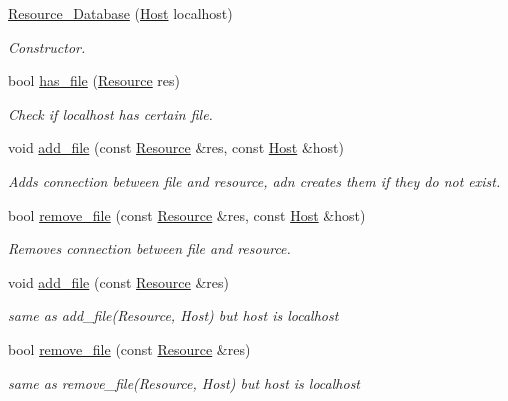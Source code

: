 \begin{DoxyCompactItemize}
\item 
\hyperlink{classsimpleP2P_1_1Resource__Database_a0158b1b1c4583d60534c2bea5dc437a3}{Resource\+\_\+\+Database} (\hyperlink{classsimpleP2P_1_1Host}{Host} localhost)
\begin{DoxyCompactList}\small\item\em Constructor. \end{DoxyCompactList}\item 
bool \hyperlink{classsimpleP2P_1_1Resource__Database_abcb6489372a4030199425ce45aaa5a6b}{has\+\_\+file} (\hyperlink{classsimpleP2P_1_1Resource}{Resource} res)
\begin{DoxyCompactList}\small\item\em Check if localhost has certain file. \end{DoxyCompactList}\item 
void \hyperlink{classsimpleP2P_1_1Resource__Database_a7afdd297b15fb225b61f9d52e2ab9cc6}{add\+\_\+file} (const \hyperlink{classsimpleP2P_1_1Resource}{Resource} \&res, const \hyperlink{classsimpleP2P_1_1Host}{Host} \&host)
\begin{DoxyCompactList}\small\item\em Adds connection between file and resource, adn creates them if they do not exist. \end{DoxyCompactList}\item 
bool \hyperlink{classsimpleP2P_1_1Resource__Database_a9b0fe1012eba333db6d8e99b02764d4d}{remove\+\_\+file} (const \hyperlink{classsimpleP2P_1_1Resource}{Resource} \&res, const \hyperlink{classsimpleP2P_1_1Host}{Host} \&host)
\begin{DoxyCompactList}\small\item\em Removes connection between file and resource. \end{DoxyCompactList}\item 
void \hyperlink{classsimpleP2P_1_1Resource__Database_a8ac7f42f7de6f3281974d2be7f1ea8e8}{add\+\_\+file} (const \hyperlink{classsimpleP2P_1_1Resource}{Resource} \&res)
\begin{DoxyCompactList}\small\item\em same as add\+\_\+file(\+Resource, Host) but host is localhost \end{DoxyCompactList}\item 
bool \hyperlink{classsimpleP2P_1_1Resource__Database_aa7e7b4575b8217dc3e52fb741ff0474a}{remove\+\_\+file} (const \hyperlink{classsimpleP2P_1_1Resource}{Resource} \&res)
\begin{DoxyCompactList}\small\item\em same as remove\+\_\+file(\+Resource, Host) but host is localhost \end{DoxyCompactList}\item 

\end{DoxyCompactItemize}
